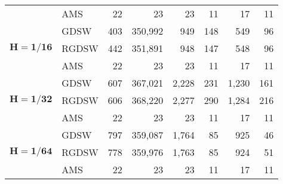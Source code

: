 \begin{table}[H]
\begin{tabular}{llrrrrrr}
\cline{2-8}
 & AMS & 22 & {\cellcolor[HTML]{7EAFF1}} \color[HTML]{000000} 23 & {\cellcolor[HTML]{7EAFF1}} \color[HTML]{000000} 23 & {\cellcolor[HTML]{BB9CA9}} \color[HTML]{F1F1F1} 11 & {\cellcolor[HTML]{945357}} \color[HTML]{F1F1F1} 17 & 11 \\
\cline{1-8} \cline{2-8}
\multirow[c]{3}{*}{$\mathbf{H=1/16}$} & GDSW & 403 & {\cellcolor[HTML]{C1D2F8}} \color[HTML]{000000} 350,992 & {\cellcolor[HTML]{9FC0F4}} \color[HTML]{000000} 949 & {\cellcolor[HTML]{945357}} \color[HTML]{F1F1F1} 148 & {\cellcolor[HTML]{7EAFF1}} \color[HTML]{000000} 549 & 96 \\
\cline{2-8}
 & RGDSW & 442 & {\cellcolor[HTML]{C1D2F8}} \color[HTML]{000000} 351,891 & {\cellcolor[HTML]{9FC0F4}} \color[HTML]{000000} 948 & {\cellcolor[HTML]{945357}} \color[HTML]{F1F1F1} 147 & {\cellcolor[HTML]{7EAFF1}} \color[HTML]{000000} 548 & 96 \\
\cline{2-8}
 & AMS & 22 & {\cellcolor[HTML]{7EAFF1}} \color[HTML]{000000} 23 & {\cellcolor[HTML]{7EAFF1}} \color[HTML]{000000} 23 & {\cellcolor[HTML]{BB9CA9}} \color[HTML]{F1F1F1} 11 & {\cellcolor[HTML]{945357}} \color[HTML]{F1F1F1} 17 & 11 \\
\cline{1-8} \cline{2-8}
\multirow[c]{3}{*}{$\mathbf{H=1/32}$} & GDSW & 607 & {\cellcolor[HTML]{C1D2F8}} \color[HTML]{000000} 367,021 & {\cellcolor[HTML]{9FC0F4}} \color[HTML]{000000} 2,228 & {\cellcolor[HTML]{945357}} \color[HTML]{F1F1F1} 231 & {\cellcolor[HTML]{7EAFF1}} \color[HTML]{000000} 1,230 & 161 \\
\cline{2-8}
 & RGDSW & 606 & {\cellcolor[HTML]{C1D2F8}} \color[HTML]{000000} 368,220 & {\cellcolor[HTML]{9FC0F4}} \color[HTML]{000000} 2,277 & {\cellcolor[HTML]{945357}} \color[HTML]{F1F1F1} 290 & {\cellcolor[HTML]{7EAFF1}} \color[HTML]{000000} 1,284 & 216 \\
\cline{2-8}
 & AMS & 22 & {\cellcolor[HTML]{7EAFF1}} \color[HTML]{000000} 23 & {\cellcolor[HTML]{7EAFF1}} \color[HTML]{000000} 23 & {\cellcolor[HTML]{BB9CA9}} \color[HTML]{F1F1F1} 11 & {\cellcolor[HTML]{945357}} \color[HTML]{F1F1F1} 17 & 11 \\
\cline{1-8} \cline{2-8}
\multirow[c]{3}{*}{$\mathbf{H=1/64}$} & GDSW & 797 & {\cellcolor[HTML]{C1D2F8}} \color[HTML]{000000} 359,087 & {\cellcolor[HTML]{9FC0F4}} \color[HTML]{000000} 1,764 & {\cellcolor[HTML]{945357}} \color[HTML]{F1F1F1} 85 & {\cellcolor[HTML]{7EAFF1}} \color[HTML]{000000} 925 & 46 \\
\cline{2-8}
 & RGDSW & 778 & {\cellcolor[HTML]{C1D2F8}} \color[HTML]{000000} 359,976 & {\cellcolor[HTML]{9FC0F4}} \color[HTML]{000000} 1,763 & {\cellcolor[HTML]{945357}} \color[HTML]{F1F1F1} 85 & {\cellcolor[HTML]{7EAFF1}} \color[HTML]{000000} 924 & 51 \\
\cline{2-8}
 & AMS & 22 & {\cellcolor[HTML]{7EAFF1}} \color[HTML]{000000} 23 & {\cellcolor[HTML]{7EAFF1}} \color[HTML]{000000} 23 & {\cellcolor[HTML]{BB9CA9}} \color[HTML]{F1F1F1} 11 & {\cellcolor[HTML]{945357}} \color[HTML]{F1F1F1} 17 & 11 \\
\cline{1-8} \cline{2-8}
\bottomrule
\end{tabular}
\end{table}
